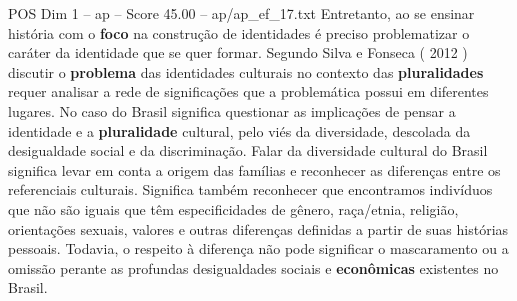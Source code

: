 \begin{textsample}{POS Dim 1 – ap – Score 45.00 – ap/ap\_ef\_17.txt}
Entretanto, ao se ensinar história com o \textbf{foco} na construção de identidades é preciso problematizar o caráter da identidade que se quer formar.
Segundo Silva e Fonseca ( 2012 ) discutir o \textbf{problema} das identidades culturais no contexto das \textbf{pluralidades} requer analisar a rede de significações que a problemática possui em diferentes lugares.
No caso do Brasil significa questionar as implicações de pensar a identidade e a \textbf{pluralidade} cultural, pelo viés da diversidade, descolada da desigualdade social e da discriminação.
Falar da diversidade cultural do Brasil significa levar em conta a origem das famílias e reconhecer as diferenças entre os referenciais culturais.
Significa também reconhecer que encontramos indivíduos que não são iguais que têm especificidades de gênero, raça/etnia, religião, orientações sexuais, valores e outras diferenças definidas a partir de suas histórias pessoais.
Todavia, o respeito à diferença não pode significar o mascaramento ou a omissão perante as profundas desigualdades sociais e \textbf{econômicas} existentes no Brasil.

\end{textsample}
